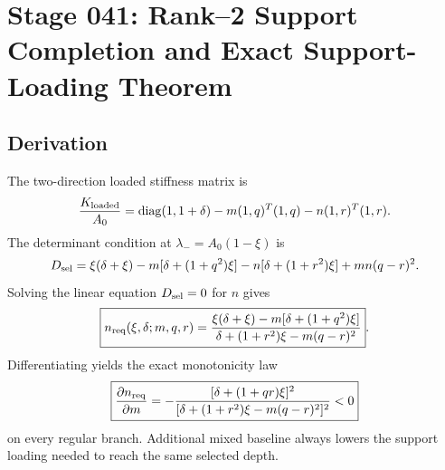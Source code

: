 \section[Stage 041]{Stage 041: Rank--2 Support Completion and Exact Support-Loading Theorem}
\label{stage:041}



\subsection*{Derivation}

The two-direction loaded stiffness matrix is
\begin{equation}
\label{eq:app-stage041-loaded-matrix}
\frac{K_{\rm loaded}}{A_0}
=\operatorname{diag}(1,1+\delta)
-m(1,q)^T(1,q)
-n(1,r)^T(1,r).
\end{equation}
The determinant condition at \(\lambda_-=A_0(1-\xi)\) is
\begin{equation}
\label{eq:app-stage041-Dsel}
D_{\rm sel}
=\xi(\delta+\xi)
-m[\delta+(1+q^2)\xi]
-n[\delta+(1+r^2)\xi]
+mn(q-r)^2.
\end{equation}
Solving the linear equation \(D_{\rm sel}=0\) for \(n\) gives
\begin{equation}
\label{eq:app-stage041-nreq}
\boxed{
 n_{\rm req}(\xi,\delta;m,q,r)
=\frac{\xi(\delta+\xi)-m[\delta+(1+q^2)\xi]}
{\delta+(1+r^2)\xi-m(q-r)^2}}.
\end{equation}
Differentiating yields the exact monotonicity law
\begin{equation}
\label{eq:app-stage041-nreq-derivative}
\boxed{
\frac{\partial n_{\rm req}}{\partial m}
=-\frac{[\delta+(1+qr)\xi]^2}
{[\delta+(1+r^2)\xi-m(q-r)^2]^2}<0
}
\end{equation}
on every regular branch.  Additional mixed baseline always lowers the support loading needed to reach the same selected depth.

